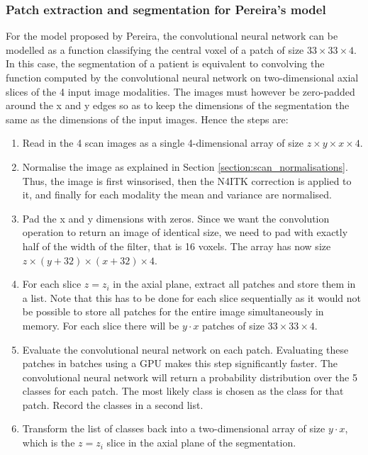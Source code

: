 \documentclass[12pt,a4paper,twoside,openright]{report}
\begin{document}
\subsubsection{Patch extraction and segmentation for Pereira's model}
For the model proposed by Pereira, the convolutional neural network can be modelled as a function classifying the central voxel of a patch of size $33 \times 33 \times 4$. In this case, the segmentation of a patient is equivalent to convolving the function computed by the convolutional neural network on two-dimensional axial slices of the 4 input image modalities. The images must however be zero-padded around the x and y edges so as to keep the dimensions of the segmentation the same as the dimensions of the input images. Hence the steps are:
\begin{enumerate}
	\item Read in the 4 scan images as a single 4-dimensional array of size $z \times y \times x \times 4$.
	\item Normalise the image as explained in Section \ref{section:scan_normalisations}. Thus, the image is first winsorised, then the N4ITK correction is applied to it, and finally for each modality the mean and variance are normalised.
	\item Pad the x and y dimensions with zeros. Since we want the convolution operation to return an image of identical size, we need to pad with exactly half of the width of the filter, that is 16 voxels. The array has now size $z \times (y + 32) \times (x + 32) \times 4$.
	\item For each slice $z = z_i$ in the axial plane, extract all patches and store them in a list. Note that this has to be done for each slice sequentially as it would not be possible to store all patches for the entire image simultaneously in memory. For each slice there will be $y \cdot x$ patches of size $33 \times 33 \times 4$.
	\item Evaluate the convolutional neural network on each patch. Evaluating these patches in batches using a GPU makes this step significantly faster. The convolutional neural network will return a probability distribution over the 5 classes for each patch. The most likely class is chosen as the class for that patch. Record the classes in a second list.
	\item Transform the list of classes back into a two-dimensional array of size $y \cdot x$, which is the $z = z_i$ slice in the axial plane of the segmentation.
\end{enumerate}
\end{document}
